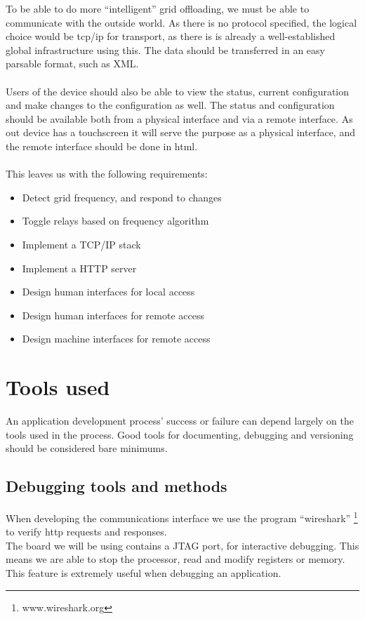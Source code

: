To be able to do more ``intelligent'' grid offloading, we must be able to communicate with the outside world. As there is no protocol specified, the logical choice would be tcp/ip for transport, as there is is already a well-established global infrastructure using this. The data should be transferred in an easy parsable format, such as XML.\\\\
Users of the device should also be able to view the status, current configuration and make changes to the configuration as well. The status and configuration should be available both from a physical interface and via a remote interface. As out device has a touchscreen it will serve the purpose as a physical interface, and the remote interface should be done in html.\\\\
This leaves us with the following requirements:
\begin{itemize}
\item Detect grid frequency, and respond to changes
\item Toggle relays based on frequency algorithm
\item Implement a TCP/IP stack
\item Implement a HTTP server
\item Design human interfaces for local access
\item Design human interfaces for remote access
\item Design machine interfaces for remote access
\end{itemize}

\section{Tools used}
An application development process' success or failure can depend largely on the tools used in the process. Good tools for documenting, debugging and versioning should be considered bare minimums.
\subsection{Debugging tools and methods}
When developing the communications interface we use the program ``wireshark'' \footnote{www.wireshark.org} to verify http requests and responses.\\
The board we will be using contains a JTAG port, for interactive debugging. This means we are able to stop the processor, read and modify registers or memory. This feature is extremely useful when debugging an application.

